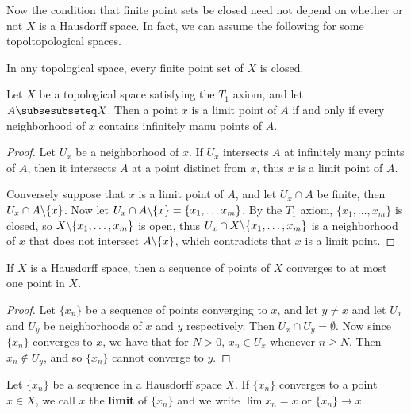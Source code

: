 Now the condition that finite point sets be closed need not depend on whether or
not $X$ is a Hausdorff space. In fact, we can assume the following for some
topoltopological spaces.

\begin{axiom}\label{axm1.6.1}
    In any topological space, every finite point set of $X$ is closed.
\end{axiom}

\begin{theorem}\label{1.6.10}
    Let $X$ be a topological space satisfying the $ T_1$ axiom, and let $A
    \subsesubseteq X$. Then a point  $x$ is a limit point of  $A$ if and only if
    every neighborhood of  $x$ contains infinitely manu points of  $A$.
\end{theorem}
\begin{proof}
    Let $U_x$ be a neighborhood of  $x$. If  $U_x$ intersects $A$ at infinitely
    many points of  $A$, then it intersects  $A$ at a point distinct from  $x$,
    thus  $x$ is a limit point of  $A$.

    Conversely suppose that  $x$ is a limit point of  $A$, and let  $U_x \cap A$
    be finite, then  $U_x \cap A \backslash \{x\}$. Now let  $U_x \cap
    A \backslash \{x\}=\{x_1, \dots x_m\}$. By the $T_1$ axiom,  $\{x_1, \dots,
    x_m\}$ is closed, so $X \backslash \{x_1, \dots,
    x_m\}$ is open, thus $U_x \cap X \backslash \{x_1, \dots,
    x_m\}$ is a neighborhood of $x$ that does not intersect  $A \backslash \{x\}$,
    which contradicts that  $x$ is a limit point.
\end{proof}

\begin{theorem}\label{1.6.11}
    If $X$ is a Hausdorff space, then a sequence of points of  $X$ converges to
    at most one point in  $X$.
\end{theorem}
\begin{proof}
    Let $\{x_n\}$ be a sequence of points converging to $x$, and let  $y \neq x$
    and let  $U_x$ and  $U_y$ be neighborhoods of  $x$ and  $y$ respectively.
    Then $U_x \cap U_y = \emptyset$. Now since  $\{x_n\}$ converges to  $x$, we
    have that for $N>0$, $x_n \in U_x$ whenever $n \geq N$. Then $x_n \notin
    U_y$, and so  $\{x_n\}$ cannot converge to  $y$.
\end{proof}

\begin{definition}
    Let $\{x_n\}$ be a sequence in a Hausdorff space  $X$. If  $\{x_n\}$
    converges to a point $x \in X$, we call  $x$ the \textbf{limit} of
    $\{x_n\}$ and we write  $\lim{x_n}=x$ or  $\{x_n\} \rightarrow x$.		
\end{definition}

